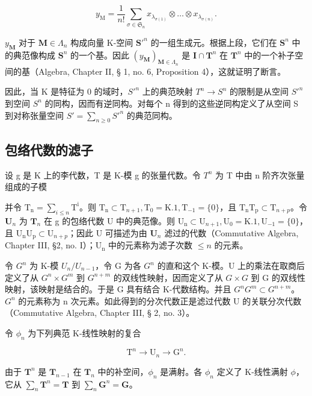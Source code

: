 \[
y _ {\mathrm{M}} = \frac {1}{n !} \sum_ {\sigma \in \mathfrak {S} _ {n}} x _ {\lambda_ {\sigma (1)}} \otimes \dots \otimes x _ {\lambda_ {\sigma (n)}}.
\]

\(y_{\mathbf{M}}\) 对于 \(\mathbf{M} \in \Lambda_n\) 构成向量 K-空间 \(\mathbf{S}'^n\) 的一组生成元。根据上段，它们在 \(\mathbf{S}^n\) 中的典范像构成 \(\mathbf{S}^n\) 的一个基。因此 \((y_{\mathbf{M}})_{\mathbf{M} \in \Lambda_n}\) 是 \(\mathbf{I} \cap \mathbf{T}^n\) 在 \(\mathbf{T}^n\) 中的一个补子空间的基（Algebra, Chapter II, § 1, no. 6, Proposition 4），这就证明了断言。

因此，当 K 是特征为 0 的域时，\(S'^{n}\) 上的典范映射 \(T^{n} \rightarrow S^{n}\) 的限制是从空间 \(S'^{n}\) 到空间 \(S^{n}\) 的同构，因而有逆同构。对每个 n 得到的这些逆同构定义了从空间 S 到对称张量空间 \(S' = \sum_{n \geqslant 0} S'^{n}\) 的典范同构。

\subsection{包络代数的滤子}

设 g 是 K 上的李代数，T 是 K-模 g 的张量代数。令 \(T^{n}\) 为 T 中由 n 阶齐次张量组成的子模

并令 \(\mathrm{T_n} = \sum_{i\leqslant n}\mathrm{T^i}\)。则 \(\mathrm{T_n}\subset \mathrm{T}_{n + 1},\mathrm{T_0} = \mathrm{K}.1,\mathrm{T}_{-1} = \{0\}\)，且 \(\mathrm{T_nT_p}\subset \mathrm{T}_{n + p}\)。令 \(\mathbf{U}_n\) 为 \(\mathbf{T}_n\) 在 g 的包络代数 U 中的典范像。则 \(\mathrm{U_n}\subset \mathrm{U}_{n + 1},\mathrm{U_0} = \mathrm{K}.1,\mathrm{U}_{-1} = \{0\}\)，且 \(\mathrm{U_nU_p}\subset \mathrm{U}_{n + p}\)；因此 U 可描述为由 \(\mathbf{U}_n\) 滤过的代数（Commutative Algebra, Chapter III, §2, no. I）；\(\mathrm{U_n}\) 中的元素称为滤子次数 \(\leqslant n\) 的元素。

令 \(G^n\) 为 K-模 \(U_n / U_{n-1}\)，令 G 为各 \(G^n\) 的直和这个 K-模。U 上的乘法在取商后定义了从 \(G^n \times G^m\) 到 \(G^{n+m}\) 的双线性映射，因而定义了从 \(G \times G\) 到 G 的双线性映射，该映射是结合的。于是 G 具有结合 K-代数结构。并且 \(G^n G^m \subset G^{n+m}\)。\(G^n\) 的元素称为 n 次元素。如此得到的分次代数正是滤过代数 U 的关联分次代数（Commutative Algebra, Chapter III, § 2, no. 3）。

令 \(\phi_{n}\) 为下列典范 K-线性映射的复合

\[
\mathrm{T} ^ {n} \rightarrow \mathrm{U} _ {n} \rightarrow \mathrm{G} ^ {n}.
\]

由于 \(\mathbf{T}^n\) 是 \(\mathbf{T}_{n - 1}\) 在 \(\mathbf{T}_n\) 中的补空间，\(\phi_n\) 是满射。各 \(\phi_n\) 定义了 K-线性满射 \(\phi\)，它从 \(\sum_{n}\mathbf{T}^{n} = \mathbf{T}\) 到 \(\sum_{n}\mathbf{G}^{n} = \mathbf{G}\)。

